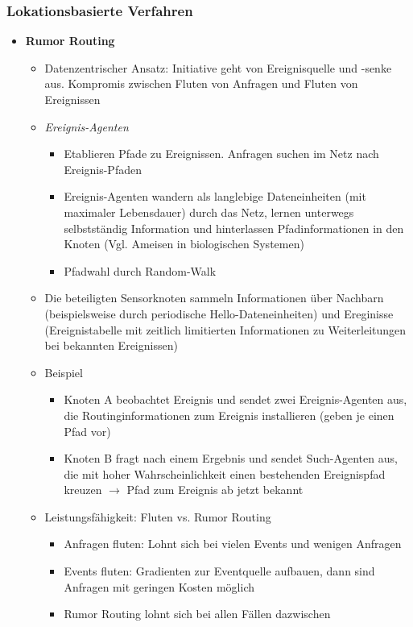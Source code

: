 \subsubsection{Lokationsbasierte Verfahren}
\begin{itemize}
	\item \textbf{Rumor Routing}
	\begin{itemize}
		\item Datenzentrischer Ansatz: Initiative geht von Ereignisquelle und -senke aus. Kompromis zwischen Fluten von Anfragen und Fluten von Ereignissen
		\item \textit{Ereignis-Agenten}
		\begin{itemize}
			\item Etablieren Pfade zu Ereignissen. Anfragen suchen im Netz nach Ereignis-Pfaden
			\item Ereignis-Agenten wandern als langlebige Dateneinheiten (mit maximaler Lebensdauer) durch das Netz, lernen unterwegs selbstständig Information und hinterlassen Pfadinformationen in den Knoten (Vgl. Ameisen in biologischen Systemen)
			\item Pfadwahl durch Random-Walk
		\end{itemize}
		\item Die beteiligten Sensorknoten sammeln Informationen über Nachbarn (beispielsweise durch periodische Hello-Dateneinheiten) und Ereginisse (Ereignistabelle mit zeitlich limitierten Informationen zu Weiterleitungen bei bekannten Ereignissen)
		\item Beispiel
		\begin{itemize}
			\item Knoten A beobachtet Ereignis und sendet zwei Ereignis-Agenten aus, die Routinginformationen zum Ereignis installieren (geben je einen Pfad vor)
			\item Knoten B fragt nach einem Ergebnis und sendet Such-Agenten aus, die mit hoher Wahrscheinlichkeit einen bestehenden Ereignispfad kreuzen \(\rightarrow\) Pfad zum Ereignis ab jetzt bekannt
		\end{itemize}
		\item Leistungsfähigkeit: Fluten vs. Rumor Routing
		\begin{itemize}
			\item Anfragen fluten: Lohnt sich bei vielen Events und wenigen Anfragen
			\item Events fluten: Gradienten zur Eventquelle aufbauen, dann sind Anfragen mit geringen Kosten möglich
			\item Rumor Routing lohnt sich bei allen Fällen dazwischen 

\end{itemize}
\end{itemize}
\end{itemize}
